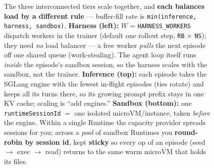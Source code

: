 \documentclass[
  paper=a4,
  ,captions=tableheading
]{scrartcl}
\begin{document}
\begin{figure}[htbp]
{%
}
\caption{The three interconnected tiers scale together, and \textbf{each balances load by a different rule} --- buffer-fill rate is \texttt{min(inference, harness, sandbox)}. \textbf{Harness (left):} $W$ = \texttt{HARNESS\_WORKERS} dispatch workers in the trainer (default one rollout step, \texttt{RB} $\times$ \texttt{NS}); they need \emph{no} load balancer --- a free worker \emph{pulls} the next episode off one shared queue (work-stealing). The agent loop itself runs \emph{inside} the episode's sandbox session, so the harness scales with the sandbox, not the trainer. \textbf{Inference (top):} each episode takes the SGLang engine with the fewest in-flight episodes (ties rotate) and keeps all its turns there, so its growing prompt prefix stays in one KV cache; scaling is ``add engines.'' \textbf{Sandbox (bottom):} one \texttt{runtimeSessionId} $=$ one isolated microVM/instance, taken \emph{before} the engine. Within a single Runtime the capacity provider spreads sessions for you; across a \emph{pool} of sandbox Runtimes you \textbf{round-robin by session id}, kept \textbf{sticky} so every op of an episode (seed $\rightarrow$ exec $\rightarrow$ read) returns to the same warm microVM that holds its files.}
\end{figure}
\end{document}
